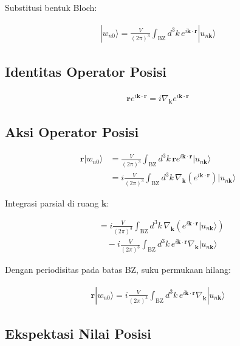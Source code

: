 Substitusi bentuk Bloch:

\begin{align}
| w_{n0} \rangle
=
\frac{V}{(2\pi)^3}
\int_{\text{BZ}} d^3k \,
e^{i\mathbf{k}\cdot\mathbf{r}}
| u_{n\mathbf{k}} \rangle
\end{align}

\subsection*{Identitas Operator Posisi}

\begin{align}
\mathbf{r} e^{i\mathbf{k}\cdot\mathbf{r}}
=
i \nabla_{\mathbf{k}} e^{i\mathbf{k}\cdot\mathbf{r}}
\end{align}

\subsection*{Aksi Operator Posisi}

\begin{align}
\mathbf{r}
| w_{n0} \rangle
&=
\frac{V}{(2\pi)^3}
\int_{\text{BZ}} d^3k \,
\mathbf{r}
e^{i\mathbf{k}\cdot\mathbf{r}}
| u_{n\mathbf{k}} \rangle \\
&=
i
\frac{V}{(2\pi)^3}
\int_{\text{BZ}} d^3k \,
\nabla_{\mathbf{k}}
\left(
e^{i\mathbf{k}\cdot\mathbf{r}}
\right)
| u_{n\mathbf{k}} \rangle
\end{align}

Integrasi parsial di ruang $\mathbf{k}$:

\begin{align}
&=
i
\frac{V}{(2\pi)^3}
\int_{\text{BZ}} d^3k \,
\nabla_{\mathbf{k}}
\left(
e^{i\mathbf{k}\cdot\mathbf{r}}
| u_{n\mathbf{k}} \rangle
\right) \\
&\quad
-
i
\frac{V}{(2\pi)^3}
\int_{\text{BZ}} d^3k \,
e^{i\mathbf{k}\cdot\mathbf{r}}
\nabla_{\mathbf{k}}
| u_{n\mathbf{k}} \rangle
\end{align}

Dengan periodisitas pada batas BZ, suku permukaan hilang:

\begin{align}
\mathbf{r}
| w_{n0} \rangle
=
i
\frac{V}{(2\pi)^3}
\int_{\text{BZ}} d^3k \,
e^{i\mathbf{k}\cdot\mathbf{r}}
\nabla_{\mathbf{k}}
| u_{n\mathbf{k}} \rangle
\end{align}

\subsection*{Ekspektasi Nilai Posisi}

